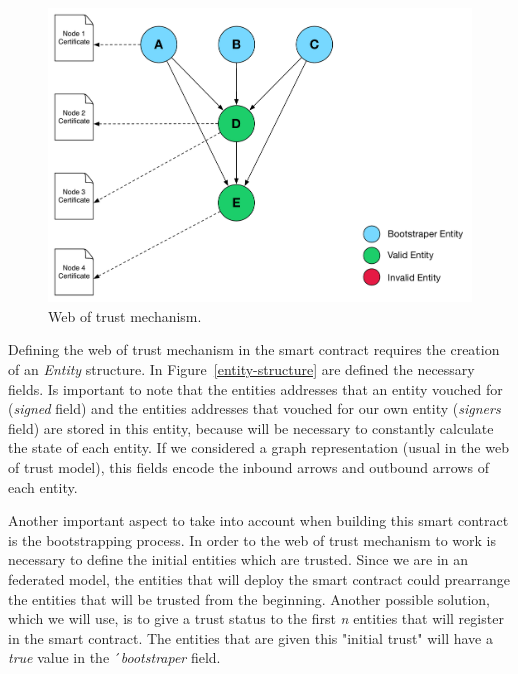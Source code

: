 \begin{figure}
  \includegraphics[width=\linewidth]{Figures/web-trust-architecture.pdf}
  \caption{Web of trust mechanism.}
  \label{fig:web-of-trust-architecture}
\end{figure}

Defining the web of trust mechanism in the smart contract requires the creation of an \textit{Entity} structure.
In Figure~\ref{entity-structure} are defined the necessary fields.
Is important to note that the entities addresses that an entity vouched for (\textit{signed} field) and the entities addresses that vouched for our own entity (\textit{signers} field) are stored in this entity, because will be necessary to constantly calculate the state of each entity.
If we considered a graph representation (usual in the web of trust model), this fields encode the inbound arrows and outbound arrows of each entity.

Another important aspect to take into account when building this smart contract is the bootstrapping process.
In order to the web of trust mechanism to work is necessary to define the initial entities which are trusted.
Since we are in an federated model, the entities that will deploy the smart contract could prearrange the entities that will be trusted from the beginning.
Another possible solution, which we will use, is to give a trust status to the first \textit{n} entities that will register in the smart contract.
The entities that are given this "initial trust" will have a \textit{true} value in the ´\textit{bootstraper} field.


